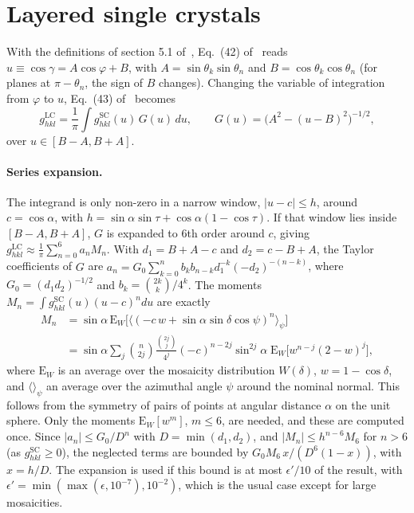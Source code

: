 \documentclass[11pt,a4paper]{article}
\newcommand{\Eq}[1]{Eq.~(#1) of~\cite{elastic}}
\begin{document}
\section{Layered single crystals}\label{sec:layered}

With the definitions of section 5.1 of~\cite{elastic}, \Eq{42} reads
$u \equiv \cos\gamma = A\cos\varphi + B$, with
$A = \sin\theta_k\sin\theta_n$ and $B = \cos\theta_k\cos\theta_n$ (for
planes at $\pi-\theta_n$, the sign of $B$ changes). Changing the variable of
integration from $\varphi$ to $u$, \Eq{43} becomes
\begin{equation}
  g^\text{LC}_{hkl} = \frac{1}{\pi}\int g^\text{SC}_{hkl}(u)\,G(u)\,du,
  \qquad G(u) = \big(A^2-(u-B)^2\big)^{-1/2},
\end{equation}
over $u \in [B-A,B+A]$.

\paragraph{Series expansion.} The integrand is only non-zero in a narrow
window, $|u-c| \le h$, around $c = \cos\alpha$, with
$h = \sin\alpha\sin\tau + \cos\alpha(1-\cos\tau)$. If that window lies inside
$[B-A,B+A]$, $G$ is expanded to 6th order around $c$, giving
$g^\text{LC}_{hkl} \approx \frac{1}{\pi}\sum_{n=0}^6 a_n M_n$. With
$d_1 = B+A-c$ and $d_2 = c-B+A$, the Taylor coefficients of $G$ are
$a_n = G_0\sum_{k=0}^n b_k b_{n-k}d_1^{-k}(-d_2)^{-(n-k)}$, where
$G_0 = (d_1d_2)^{-1/2}$ and $b_k = \binom{2k}{k}/4^k$. The moments
$M_n = \int g^\text{SC}_{hkl}(u)(u-c)^n du$ are exactly
\begin{equation}
  \begin{split}
  M_n &= \sin\alpha\,\mathrm{E}_W\Big[\big\langle(-c\,w +
  \sin\alpha\sin\delta\cos\psi)^n\big\rangle_\psi\Big]\\
  &= \sin\alpha\sum_j \binom{n}{2j}\frac{\binom{2j}{j}}{4^j}(-c)^{n-2j}
  \sin^{2j}\!\alpha\;\mathrm{E}_W\big[w^{n-j}(2-w)^j\big],
  \end{split}
\end{equation}
where $\mathrm{E}_W$ is an average over the mosaicity distribution $W(\delta)$,
$w = 1-\cos\delta$, and $\langle\rangle_\psi$ an average over the azimuthal
angle $\psi$ around the nominal normal. This follows from the symmetry of
pairs of points at angular distance $\alpha$ on the unit sphere. Only the
moments $\mathrm{E}_W[w^m]$, $m \le 6$, are needed, and these are computed
once. Since $|a_n| \le G_0/D^n$ with $D = \min(d_1,d_2)$, and
$|M_n| \le h^{n-6}M_6$ for $n > 6$ (as $g^\text{SC}_{hkl} \ge 0$), the
neglected terms are bounded by $G_0M_6\,x/(D^6(1-x))$, with $x = h/D$. The
expansion is used if this bound is at most $\epsilon'/10$ of the result, with
$\epsilon' = \min(\max(\epsilon,10^{-7}),10^{-2})$, which is the usual case
except for large mosaicities.
\end{document}
